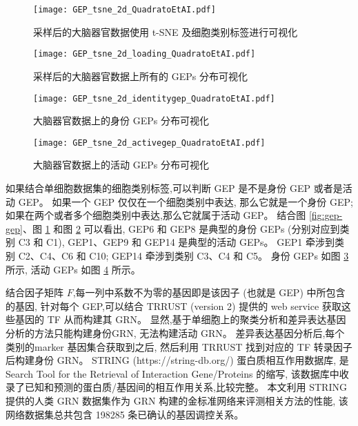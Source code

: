 \begin{figure}[!htbp]
    \centering
    \texttt{[image: GEP\_tsne\_2d\_QuadratoEtAI.pdf]}
    \caption{
    采样后的大脑器官数据使用 t-SNE 及细胞类别标签进行可视化
    }
    \label{fig:gep-tsne}
\end{figure}

\begin{figure}[!htbp]
    \centering
    \texttt{[image: GEP\_tsne\_2d\_loading\_QuadratoEtAI.pdf]}
    \caption{
    采样后的大脑器官数据上所有的 GEPs 分布可视化
    }
    \label{fig:gep-distribution}
\end{figure}

\begin{figure}[!htbp]
    \centering
    \texttt{[image: GEP\_tsne\_2d\_identitygep\_QuadratoEtAI.pdf]}
    \caption{
    大脑器官数据上的身份 GEPs 分布可视化
    }
    \label{fig:gep-identitytsne}
\end{figure}

\begin{figure}[!htbp]
    \centering
    \texttt{[image: GEP\_tsne\_2d\_activegep\_QuadratoEtAI.pdf]}
    \caption{
    大脑器官数据上的活动 GEPs 分布可视化
    }
    \label{fig:gep-activetsne}
\end{figure}

如果结合单细胞数据集的细胞类别标签,可以判断 GEP 是不是身份 GEP 或者是活动 GEP。
如果一个 GEP 仅仅在一个细胞类别中表达, 那么它就是一个身份 GEP;
如果在两个或者多个细胞类别中表达,那么它就属于活动 GEP。
结合图 \ref{fig:gep-gep}、图 \ref{fig:gep-tsne} 和图 \ref{fig:gep-distribution} 可以看出, 
GEP6 和 GEP8 是典型的身份 GEPs (分别对应到类别 C3 和 C1), GEP1、GEP9 和 GEP14 是典型的活动 GEPs。
GEP1 牵涉到类别 C2、C4、C6 和 C10; GEP14 牵涉到类别 C3、C4 和 C5。
身份 GEPs 如图 \ref{fig:gep-identitytsne} 所示,
活动 GEPs 如图 \ref{fig:gep-activetsne} 所示。


结合因子矩阵 $F$,每一列中系数不为零的基因即是该因子 (也就是 GEP) 中所包含的基因,
针对每个 GEP,可以结合 TRRUST (version 2) 提供的 web service 获取这些基因的 TF 从而构建其 GRN。
显然,基于单细胞上的聚类分析和差异表达基因分析的方法只能构建身份GRN, 无法构建活动 GRN。
差异表达基因分析后,每个类别的marker 基因集合获取到之后, 
然后利用 TRRUST 找到对应的 TF 转录因子后构建身份 GRN。
STRING (https://string-db.org/) 蛋白质相互作用数据库,
是 Search Tool for the Retrieval of Interaction Gene/Proteins 的缩写,
该数据库中收录了已知和预测的蛋白质/基因间的相互作用关系,比较完整。
本文利用 STRING 提供的人类 GRN 数据集作为 GRN 构建的金标准网络来评测相关方法的性能, 
该网络数据集总共包含 198285 条已确认的基因调控关系。

